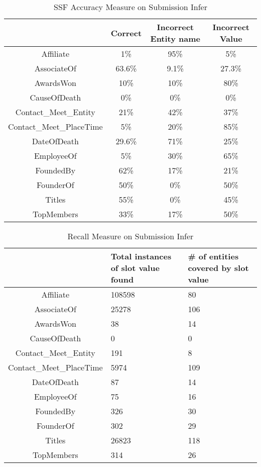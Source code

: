 \begin{table}[b]
\caption{SSF Accuracy Measure on Submission Infer }
\centering
\label{table:finalresultaccuracy}
\begin{tabular}{|c|c|c|c|}
\hline 
 & Correct & Incorrect Entity name & Incorrect Value \\ 
\hline 
Affiliate & 1\% & 95\% & 5\% \\ \hline 
AssociateOf & 63.6\% & 9.1\% & 27.3\%  \\ \hline 
AwardsWon & 10\% & 10\% & 80\%  \\ \hline 
CauseOfDeath & 0\% & 0\% & 0\%  \\ \hline 
Contact\_Meet\_Entity & 21\% & 42\% & 37\%  \\ \hline 
Contact\_Meet\_PlaceTime & 5\% & 20\% & 85\%  \\ \hline 
DateOfDeath & 29.6\% & 71\% & 25\%  \\ \hline 
EmployeeOf & 5\% & 30\% & 65\%  \\ \hline 
FoundedBy & 62\% & 17\% & 21\%  \\ \hline 
FounderOf & 50\% & 0\% & 50\%  \\ \hline 
Titles & 55\% & 0\% & 45\%  \\ \hline 
TopMembers & 33\% & 17\% & 50\%  \\ \hline 

\end{tabular} 
\end{table}







\begin{table}[t]
\caption{Recall Measure on Submission Infer }
\centering
\label{table:finalresultrecall}
\begin{tabular}{|c|p{3cm}|p{4cm}|}
\hline 
 & Total instances of slot value found & \# of entities covered by slot value \\ 
\hline 
Affiliate & 108598 & 80 \\ \hline 
AssociateOf & 25278 & 106 \\ \hline 
AwardsWon & 38 & 14 \\ \hline 
CauseOfDeath & 0 & 0 \\ \hline 
Contact\_Meet\_Entity & 191 & 8 \\ \hline 
Contact\_Meet\_PlaceTime & 5974 & 109 \\ \hline 
DateOfDeath & 87 & 14 \\ \hline 
EmployeeOf & 75 & 16 \\ \hline 
FoundedBy & 326 & 30 \\ \hline 
FounderOf & 302 &  29 \\ \hline 
Titles & 26823 & 118 \\ \hline 
TopMembers & 314 & 26 \\ \hline 

\end{tabular} 
\end{table}


